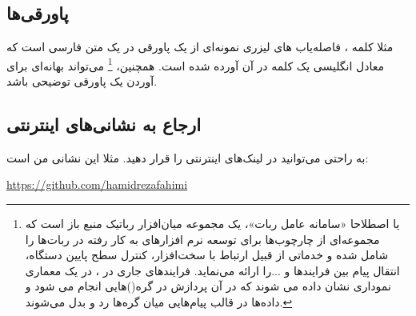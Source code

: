 \subsection{پاورقی‌ها}
مثلا کلمه
، فاصله‌یاب های لیزری
نمونه‌ای از یک پاورقی در یک متن فارسی است که معادل انگلیسی یک کلمه در آن آورده شده است.
همچنین،
\footnote{
یا اصطلاحا «سامانه عامل ربات»، یک مجموعه میان‌افزار رباتیک منبع باز است که مجموعه‌ای از چارچوب‌ها برای توسعه نرم افزارهای به کار رفته در ربات‌ها را شامل شده و خدماتی از قبیل ارتباط با سخت‌افزار، کنترل سطح پایین دستگاه، انتقال پیام بین فرایندها و ...را ارائه می‌نماید. فرایندهای جاری در 
،
در یک معماری نموداری نشان داده می شوند که در آن پردازش در گره()هایی انجام می شود و داده‌ها در قالب پیام‌هایی میان گره‌ها رد و بدل می‌شوند.
}
می‌تواند بهانه‌ای برای آوردن یک پاورقی توضیحی باشد.

\subsection{ارجاع به نشانی‌های اینترنتی}

به راحتی می‌توانید در
لینک‌های اینترنتی را قرار دهید. مثلا این نشانی
من است:

\begin{flushleft}
\url{https://github.com/hamidrezafahimi}
\end{flushleft}

